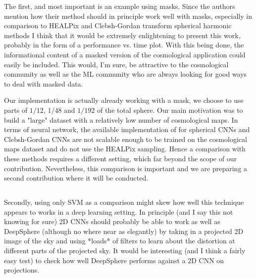 \documentclass[12pt,a4paper]{article}
\newcommand{\nati}[1]{{\color[rgb]{.1,.6,.1}{NP: #1}}}
\newcommand{\todo}[1]{{\color[rgb]{.6,.1,.6}{TODO: #1}}}
\newcommand{\1}{\b{1}}              %
\newcommand{\0}{\b{0}}              %
\begin{document}
\begin{mdframed}[style=comment]
The first, and most important is an example using masks. Since the authors mention how their method should in principle work well with masks, especially in comparison to HEALPix and Clebsh-Gordan transform spherical harmonic methods I think that it would be extremely enlightening to present this work, probably in the form of a performance vs. time plot. With this being done, the informational content of a masked version of the cosmological application could easily be included. This would, I'm sure, be attractive to the cosmological community as well as the ML community who are always looking for good ways to deal with masked data.
\end{mdframed}
\todo{Assigned: @Michael, @Nati}
Our implementation is actually already working with a mask, we choose to use parts of $1/12$, $1/48$ and $1/192$ of the total sphere. Our main motivation was to build a "large" dataset with a relatively low number of cosmological maps.
In terms of neural network, the available implementation of \cite{cohen2018sphericalcnn,kondor2018clebsch} for spherical CNNs and Clebsh-Gordan CNNs are not scalable enough to be trained on the cosmological maps dataset and do not use the HEALPix sampling. Hence a comparison with these methods requires a different setting, which far beyond the scope of our contribution. Nevertheless, this comparison is important and we are preparing a second contribution where it will be conducted.

\nati{We could compare the price of one convolution. What do you think? We can write the theoretical complexity. This is a sensitive point! }

\subsection{}

\begin{mdframed}[style=comment]
Secondly, using only SVM as a comparison might skew how well this technique appears to works in a deep learning setting. In principle (and I say this not knowing for sure) 2D CNNs should probably be able to work as well as DeepSphere (although no where near as elegantly) by taking in a projected 2D image of the sky and using *loads* of filters to learn about the distortion at different parts of the projected sky. It would be interesting (and I think a fairly easy test) to check how well DeepSphere performs against a 2D CNN on projections.
\end{mdframed}
\todo{Assigned: @Nati, @Michael, @Tomek}
\end{document}
